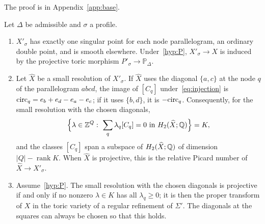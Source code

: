 The proof is in Appendix~\ref{app:base}.

\begin{proposition}\label{prop:partialres}
Let $\Delta$ be admissible and $\sigma$ a profile.
\begin{enumerate}
\item $X'_\sigma$ has exactly one singular point for each node parallelogram, an ordinary double point, and is smooth
elsewhere. Under~\ref{hyp:P}, $X'_\sigma\to X$ is induced by the projective toric morphism $P'_\sigma\to\mathbb P_\Delta$.
\item Let $\widehat X$ be a small resolution of $X'_\sigma$. If $\widehat X$ uses the diagonal $\{a,c\}$ at the node $q$ of the
parallelogram $abcd$, the image of $[C_q]$ under~\eqref{eq:injection} is $\mathrm{circ}_q=e_b+e_d-e_a-e_c$; if it uses $\{b,d\}$,
it is $-\mathrm{circ}_q$. Consequently, for the small resolution with the chosen diagonals,
\[
\Bigl\{\lambda\in\Z^Q:\ \sum_q\lambda_q[C_q]=0\text{ in }H_2(\widehat X;\Q)\Bigr\}=K,
\]
and the classes $[C_q]$ span a subspace of $H_2(\widehat X;\mathbb Q)$ of dimension $|Q|-\operatorname{rank}K$. When $\widehat X$ is
projective, this is the relative Picard number of $\widehat X\to X'_\sigma$.
\item Assume~\ref{hyp:P}. The small resolution with the chosen diagonals is projective if and only if no nonzero
$\lambda\in K$ has all $\lambda_q\ge0$; it is then the proper transform of $X$ in the toric variety of a regular
refinement of $\Sigma'$. The diagonals at the squares can always be chosen so that this holds.
\end{enumerate}
\end{proposition}

